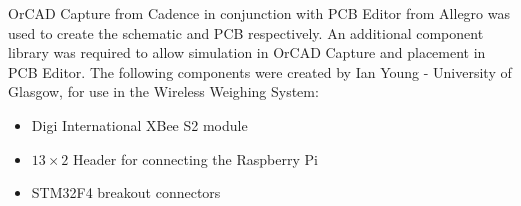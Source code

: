 OrCAD Capture from Cadence in conjunction with PCB Editor from Allegro was used to create the schematic and PCB respectively.  An additional component library was required to allow simulation in OrCAD Capture and placement in PCB Editor. The following components were created by Ian Young - University of Glasgow, for use in the Wireless Weighing System:
	\begin{itemize}
		\item Digi International XBee S2 module
		\item $13\times2$ Header for connecting the Raspberry Pi
		\item STM32F4 breakout connectors
	\end{itemize}
